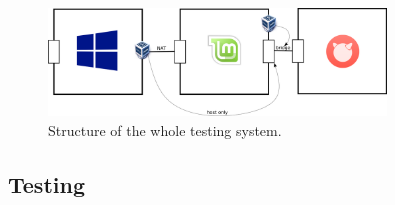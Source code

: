 \documentclass[10pt,a4paper,titlepage]{article}
\begin{document}
            \begin{figure}[h!]
                \begin{center}
                    \includegraphics[width=0.80\textwidth]{programming.png}
                    \caption{Structure of the whole testing system. \label{fig:TestingSystem} \cite{WindowsLogo} \cite{MintLogo} \cite{FreeBSDLogo} \cite{VirtualBoxLogo}}
                \end{center}
            \end{figure}

        \subsection{Testing}
    
    \newpage
    \printbibliography
    
    
\end{document}
